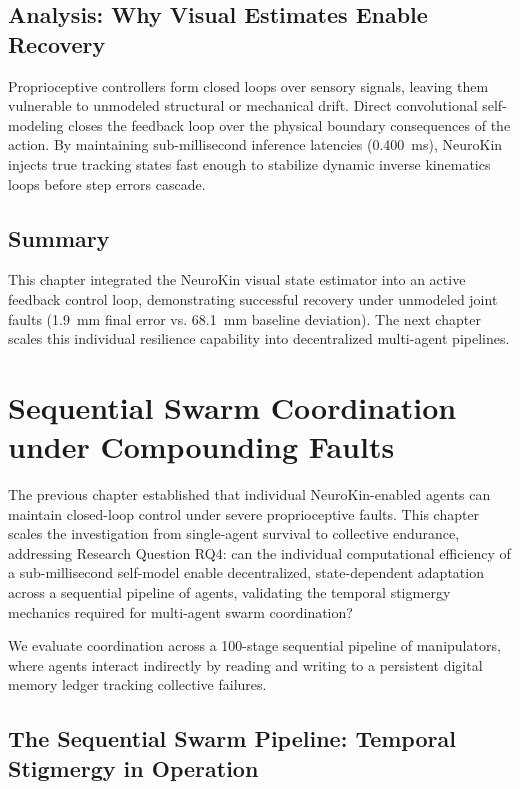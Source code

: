 \documentclass[12pt,a4paper,oneside]{report}
\begin{document}
\section{Analysis: Why Visual Estimates Enable Recovery}
Proprioceptive controllers form closed loops over sensory signals, leaving them vulnerable to unmodeled structural or mechanical drift. Direct convolutional self-modeling closes the feedback loop over the physical boundary consequences of the action. By maintaining sub-millisecond inference latencies (0.400~ms), NeuroKin injects true tracking states fast enough to stabilize dynamic inverse kinematics loops before step errors cascade.

\section{Summary}
This chapter integrated the NeuroKin visual state estimator into an active feedback control loop, demonstrating successful recovery under unmodeled joint faults (1.9~mm final error vs. 68.1~mm baseline deviation). The next chapter scales this individual resilience capability into decentralized multi-agent pipelines.

\chapter{Sequential Swarm Coordination under Compounding Faults}
\label{chap:sequential_swarm_coordination}

The previous chapter established that individual NeuroKin-enabled agents can maintain closed-loop control under severe proprioceptive faults. This chapter scales the investigation from single-agent survival to collective endurance, addressing Research Question RQ4: can the individual computational efficiency of a sub-millisecond self-model enable decentralized, state-dependent adaptation across a sequential pipeline of agents, validating the temporal stigmergy mechanics required for multi-agent swarm coordination?

We evaluate coordination across a 100-stage sequential pipeline of manipulators, where agents interact indirectly by reading and writing to a persistent digital memory ledger tracking collective failures.

\section{The Sequential Swarm Pipeline: Temporal Stigmergy in Operation}
\label{sec:swarm_pipeline}
\end{document}
